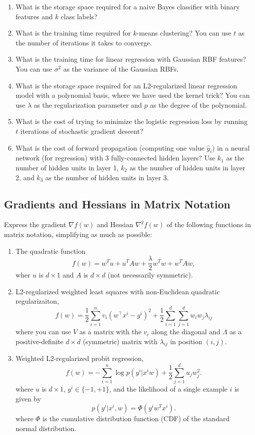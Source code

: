 \documentclass{article}
\def\blu#1{{\color{blu}#1}}
\def\enum#1{\begin{enumerate}#1\end{enumerate}}
\begin{document}
\blu{
\enum{
\item What is the storage space required for a naive Bayes classifier with binary features and $k$ class labels?
\item What is the training time required for $k$-means clustering? You can use $t$ as the number of iterations it takes to converge.
\item  What is the training time for linear regression with Gaussian RBF features? You can use $\sigma^2$ as the variance of the Gaussian RBFs.
\item What is the storage space required for an L2-regularized linear regression model with a polynomial basis, where we have used the kernel trick? You can use $\lambda$ as the regularization parameter and $p$ as the degree of the polynomial.
\item What is the cost of trying to minimize the logistic regression loss by running $t$ iterations of stochastic gradient descent?
\item What is the cost of forward propagation (computing one value $\hat{y}_i$) in a neural network (for regression) with 3 fully-connected hidden layers? Use $k_1$ as the number of hidden units in layer 1, $k_2$ as the number of hidden units in layer 2, and $k_3$ as the number of hidden units in layer 3.
}
}



\subsection{Gradients and Hessians in Matrix Notation}

Express the gradient $\nabla f(w)$ and Hessian $\nabla^2 f(w)$ of the following functions in matrix notation, simplifying as much as possible:
\blu{
\enum{
\item The quadratic function
\[
f(w) = w^Tu + u^TAw + \frac{\lambda}{2}w^Tw + w^TAw,
\]
wher $u$ is $d \times 1$ and $A$ is $d \times d$ (not necessarily symmetric).
\item L2-regularized weighted least squares with non-Euclidean quadratic regularizaiton,
\[
f(w) = \frac{1}{2}\sum_{i=1}^n v_i(w^\top x^i - y^i)^2 + \frac{1}{2}\sum_{i=1}^d\sum_{j=1}^d w_iw_j\lambda_{ij}
\]
where you can use $V$ as a matrix with the $v_i$ along the diagonal and $\Lambda$ as a positive-definite $d \times d$ (symmetric) matrix with $\lambda_{ij}$ in position $(i,j)$.
\item Weighted L2-regularized probit regression,
\[
f(w) = - \sum_{i=1}^n \log p(y^i | x^i w) + \frac{1}{2}\sum_{j=1}^d u_jw_j^2.
\]
where $u$ is $d \times 1$, $y^i \in \{-1,+1\}$, and the likelihood of a single example $i$ is given by
\[
p(y^i| x^i, w) = \Phi(y^iw^Tx^i).
\]
where $\Phi$ is the cumulative distribution function (CDF) of the standard normal distribution.
}}
\end{document}
